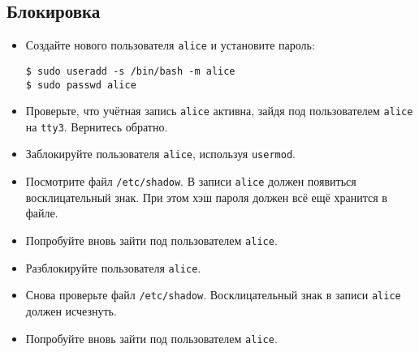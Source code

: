 \documentclass{article}
\begin{document}
\subsection{Блокировка}
\begin{itemize}
\item Создайте нового пользователя \texttt{alice} и установите пароль:
\begin{lstlisting}
$ sudo useradd -s /bin/bash -m alice
$ sudo passwd alice
\end{lstlisting}
\item Проверьте, что учётная запись \texttt{alice} активна, зайдя под пользователем \texttt{alice} на \texttt{tty3}. Вернитесь обратно.
\item Заблокируйте пользователя \texttt{alice}, используя \texttt{usermod}.
\item Посмотрите файл \texttt{/etc/shadow}. В записи \texttt{alice} должен появиться восклицательный знак. При этом хэш пароля должен всё ещё хранится в файле.
\item Попробуйте вновь зайти под пользователем \texttt{alice}.
\item Разблокируйте пользователя \texttt{alice}.
\item Снова проверьте файл \texttt{/etc/shadow}. Восклицательный знак в записи \texttt{alice} должен исчезнуть.
\item Попробуйте вновь зайти под пользователем \texttt{alice}.
\end{itemize}
\end{document}
